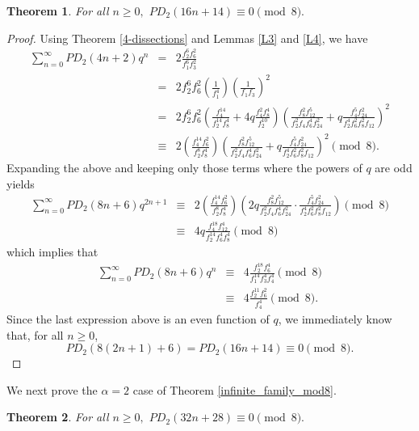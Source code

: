 \documentclass{amsart}
\newtheorem{theorem}{Theorem}[section]
\begin{document}
\begin{theorem}
\label{16n14_mod8}
 For all $n\geq 0,$ $PD_2(16n+14) \equiv 0 \pmod{8}.$   
\end{theorem}
\begin{proof}
Using Theorem \ref{4-dissections} and Lemmas \ref{L3} and \ref{L4}, we have 
\begin{eqnarray*}
\sum_{n=0}^{\infty} PD_2(4n+2)q^{n} 
&=&
2\frac{f_2^6f_6^2}{f_1^6f_3^2}  \\
&=& 
2f_2^6f_6^2\left( \frac{1}{f_1^4} \right)\left(\frac{1}{f_1f_3}\right)^2 \\
&=&
2f_2^6f_6^2\left( \frac{f_4^{14}}{f_2^{14}f_{8}^4} + 4q \frac{f_4^2f_{8}^4}{f_2^{10}} \right)\left( \frac{f_8^2f_{12}^5}{f_2^2f_4f_6^4f_{24}^2} + q \frac{f_4^5f_{24}^2}{f_2^4f_6^2f_8^2f_{12}}  \right)^2 \\
&\equiv &
2\left( \frac{f_4^{14}f_6^2}{f_2^{8}f_{8}^4}  \right)\left( \frac{f_8^2f_{12}^5}{f_2^2f_4f_6^4f_{24}^2} + q \frac{f_4^5f_{24}^2}{f_2^4f_6^2f_8^2f_{12}}  \right)^2 \pmod{8}.
\end{eqnarray*}
Expanding the above and keeping only those terms where the powers of $q$ are odd yields 
\begin{eqnarray*}
\sum_{n=0}^{\infty} PD_2(8n+6)q^{2n+1} 
&\equiv &
2\left( \frac{f_4^{14}f_6^2}{f_2^{8}f_{8}^4}  \right)\left(2q \frac{f_8^2f_{12}^5}{f_2^2f_4f_6^4f_{24}^2} \cdot \frac{f_4^5f_{24}^2}{f_2^4f_6^2f_8^2f_{12}}  \right) \pmod{8} \\
&\equiv &
4q\frac{f_4^{18}f_{12}^4}{f_2^{14}f_6^4f_8^4} \pmod{8}
\end{eqnarray*}    
which implies that 
\begin{eqnarray*}
\sum_{n=0}^{\infty} PD_2(8n+6)q^{n} 
&\equiv &
4\frac{f_2^{18}f_{6}^4}{f_1^{14}f_3^4f_4^4} \pmod{8} \\
&\equiv &
4\frac{f_2^{11}f_{6}^2}{f_4^4} \pmod{8}.
\end{eqnarray*}    
Since the last expression above is an even function of $q$, we immediately know that, for all $n\geq 0$, 
$$PD_2(8(2n+1)+6) = PD_2(16n+14) \equiv 0\pmod{8}.$$
    
\end{proof}
We next prove the $\alpha=2$ case of Theorem \ref{infinite_family_mod8}.  

\begin{theorem}
\label{32n28_mod8}
 For all $n\geq 0,$ $PD_2(32n+28) \equiv 0 \pmod{8}.$   
\end{theorem}
\end{document}
